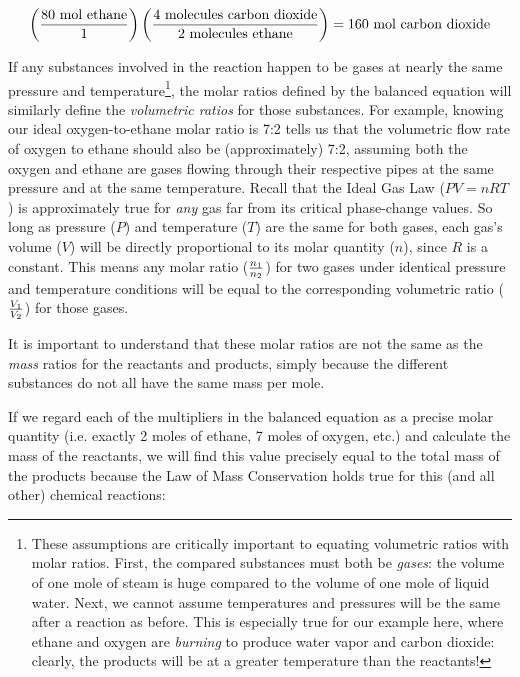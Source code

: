 $$\left({80 \hbox{ mol ethane} \over 1}\right) \left({4 \hbox{ molecules carbon dioxide} \over 2 \hbox{ molecules ethane}}\right) = 160 \hbox{ mol carbon dioxide}$$

\vskip 10pt

If any substances involved in the reaction happen to be gases at nearly the same pressure and temperature\footnote{These assumptions are critically important to equating volumetric ratios with molar ratios.  First, the compared substances must both be \textit{gases}: the volume of one mole of steam is huge compared to the volume of one mole of liquid water.  Next, we cannot assume temperatures and pressures will be the same after a reaction as before.  This is especially true for our example here, where ethane and oxygen are \textit{burning} to produce water vapor and carbon dioxide: clearly, the products will be at a greater temperature than the reactants!}, the molar ratios defined by the balanced equation will similarly define the \textit{volumetric ratios} for those substances.  For example, knowing our ideal oxygen-to-ethane molar ratio is 7:2 tells us that the volumetric flow rate of oxygen to ethane should also be (approximately) 7:2, assuming both the oxygen and ethane are gases flowing through their respective pipes at the same pressure and at the same temperature.  Recall that the Ideal Gas Law ($PV = nRT$) is approximately true for \textit{any} gas far from its critical phase-change values.  So long as pressure ($P$) and temperature ($T$) are the same for both gases, each gas's volume ($V$) will be directly proportional to its molar quantity ($n$), since $R$ is a constant.  This means any molar ratio ($n_1 \over n_2$) for two gases under identical pressure and temperature conditions will be equal to the corresponding volumetric ratio ($V_1 \over V_2$) for those gases.

\vskip 10pt

\filbreak

It is important to understand that these molar ratios are not the same as the \textit{mass} ratios for the reactants and products, simply because the different substances do not all have the same mass per mole. 

If we regard each of the multipliers in the balanced equation as a precise molar quantity (i.e. exactly 2 moles of ethane, 7 moles of oxygen, etc.) and calculate the mass of the reactants, we will find this value precisely equal to the total mass of the products because the Law of Mass Conservation holds true for this (and all other) chemical reactions:

